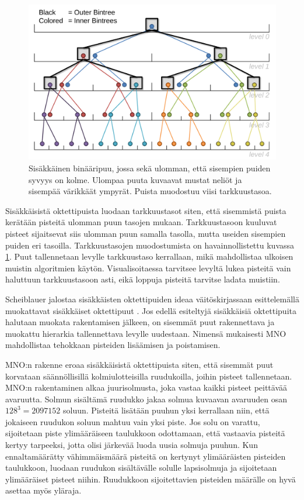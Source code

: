 \begin{figure}
    \centering
    \includegraphics[width=0.6\paperwidth]{img/nested.png}
    \caption{Sisäkkäinen binääripuu, jossa sekä ulomman, että sisempien puiden syvyys on kolme. Ulompaa puuta kuvaavat mustat neliöt ja sisempää värikkäät ympyrät. Puista muodostuu viisi tarkkuustasoa. \cite{scheiblauer}}
    \label{nested}
\end{figure}

Sisäkkäisistä oktettipuista luodaan tarkkuustasot siten, että sisemmistä puista kerätään pisteitä ulomman puun tasojen mukaan. Tarkkuustasoon kuuluvat pisteet sijaitsevat siis ulomman puun samalla tasolla, mutta useiden sisempien puiden eri tasoilla. Tarkkuustasojen muodostumista on havainnollistettu kuvassa \ref{nested}. Puut tallennetaan levylle tarkkuustaso kerrallaan, mikä mahdollistaa ulkoisen muistin algoritmien käytön. Visualisoitaessa tarvitsee levyltä lukea pisteitä vain haluttuun tarkkuustasoon asti, eikä loppuja pisteitä tarvitse ladata muistiin. \cite{ip}

Scheiblauer jalostaa sisäkkäisten oktettipuiden ideaa väitöskirjassaan esittelemällä muokattavat sisäkkäiset oktettipuut . Jos edellä esiteltyjä sisäkkäisiä oktettipuita halutaan muokata rakentamisen jälkeen, on sisemmät puut rakennettava ja muokattu hierarkia tallennettava levylle uudestaan. Nimensä mukaisesti MNO mahdollistaa tehokkaan pisteiden lisäämisen ja poistamisen. \cite{scheiblauer}  

MNO:n rakenne eroaa sisäkkäisistä oktettipuista siten, että sisemmät puut korvataan säännöllisillä kolmiulotteisilla ruudukoilla, joihin pisteet tallennetaan. MNO:n rakentaminen alkaa juurisolmusta, joka vastaa kaikki pisteet peittävää avaruutta. Solmun sisältämä ruudukko jakaa solmua kuvaavan avaruuden osan $128^3 = 2 097 152$ soluun. Pisteitä lisätään puuhun yksi kerrallaan niin, että jokaiseen ruudukon soluun mahtuu vain yksi piste. Jos solu on varattu, sijoitetaan piste ylimääräiseen taulukkoon odottamaan, että vastaavia pisteitä kertyy tarpeeksi, jotta olisi järkevää luoda uusia solmuja puuhun. Kun ennaltamäärätty vähimmäismäärä pisteitä on kertynyt ylimääräisten pisteiden taulukkoon, luodaan ruudukon sisältävälle solulle lapsisolmuja ja sijoitetaan ylimääräiset pisteet niihin. Ruudukkoon sijoitettavien pisteiden määrälle on hyvä asettaa myös yläraja. \cite{scheiblauer}

